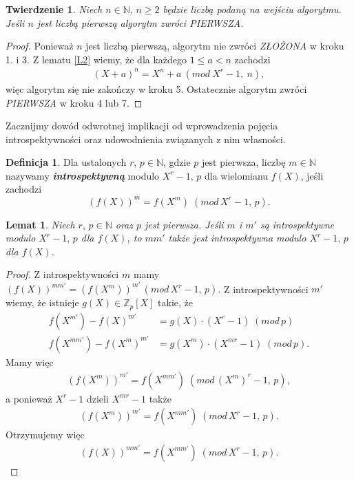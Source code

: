 \documentclass[declaration,shortabstract]{iithesis}
\theoremstyle{definition}
\newtheorem{definition}{Definicja}
\theoremstyle{remark} \newtheorem{observation}{Obserwacja}
\theoremstyle{plain} \newtheorem{theorem}{Twierdzenie}
\theoremstyle{plain} \newtheorem{lemma}{Lemat}
\theoremstyle{remark} \newtheorem*{remark*}{Uwaga}
\theoremstyle{reminder} \newtheorem*{reminder*}{Przypomnienie}
\begin{document}
\begin{theorem}
	Niech $n \in \mathbb{N}, \, n \geq 2$ będzie liczbą podaną na wejściu algorytmu. Jeśli $n$ jest liczbą pierwszą algorytm zwróci \textit{PIERWSZA}.
\end{theorem}
	
\begin{proof}
    Ponieważ $n$ jest liczbą pierwszą, algorytm nie zwróci \textit{ZŁOŻONA} w kroku 1. i 3. Z lematu \ref{L2} wiemy, że dla każdego $1 \leq a < n$ zachodzi 
    \begin{align*}
        (X + a)^n = X^n + a \: (mod \: X^r - 1, \: n),
    \end{align*}
    więc algorytm się nie zakończy w kroku 5. Ostatecznie algorytm zwróci \textit{PIERWSZA} w kroku 4 lub 7.
\end{proof}

Zacznijmy dowód odwrotnej implikacji od wprowadzenia pojęcia introspektywności oraz udowodnienia związanych z nim własności. 

\begin{definition}
	Dla ustalonych $r, \, p \in \mathbb{N}$, gdzie $p$ jest pierwsza, liczbę $m \in \mathbb{N}$ nazywamy \textbf{\textit{introspektywną}} modulo $X^r - 1, \, p$ dla wielomianu $f(X)$, jeśli zachodzi \[(f(X))^m = f(X^m) \; (mod \, X^r - 1, \, p).\]
\end{definition}
	
\begin{lemma}\label{intro1}
	Niech $r, \, p \in \mathbb{N}$ oraz $p$ jest pierwsza. Jeśli $m$ i $m'$ są introspektywne modulo $X^r - 1, \, p$ dla $f(X)$, to $mm'$ także jest introspektywna modulo $X^r - 1, \, p$ dla $f(X)$.
\end{lemma}
	
\begin{proof}
	Z introspektywności $m$ mamy $(f(X))^{mm'} = (f(X^m))^{m'} \, (mod \, X^r - 1, \, p).$ Z introspektywności $m'$ wiemy, że istnieje $g(X) \in \mathbb{Z}_p[X]$ takie, że 
	\begin{align*}
		f(X^{m'}) - {f(X)}^{m'}    & = g(X) \cdot (X^r - 1)     \; (mod \, p)\\
		f(X^{mm'}) - {f(X^m)}^{m'} & = g(X^m) \cdot (X^{mr} - 1) \; (mod \, p). 
    \end{align*}
    Mamy więc 
    \begin{align*}
        (f(X^m))^{m'} = f(X^{mm'}) \; (mod \, (X^m)^r - 1, \, p),
    \end{align*}
    a ponieważ $X^r - 1$ dzieli $X^{mr} - 1$ także 
    \begin{align*}
        (f(X^m))^{m'} = f(X^{mm'}) \; (mod \, X^r - 1, \, p).
    \end{align*}
    Otrzymujemy więc 
    \begin{align*}
        (f(X))^{mm'} = f(X^{mm'}) \; (mod \, X^r - 1, \, p).
    \end{align*}
\end{proof}
	
\end{document}
